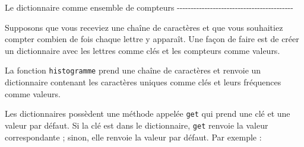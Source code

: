 \begin{Shaded}
\begin{Highlighting}[]
\OperatorTok{\textgreater{}\textgreater{}\textgreater{}}\OperatorTok{=}
\OperatorTok{\textgreater{}\textgreater{}\textgreater{}}  
\end{Highlighting}
\end{Shaded}

Le dictionnaire comme ensemble de compteurs
-\/-\/-\/-\/-\/-\/-\/-\/-\/-\/-\/-\/-\/-\/-\/-\/-\/-\/-\/-\/-\/-\/-\/-\/-\/-\/-\/-\/-\/-\/-\/-\/-\/-\/-\/-\/-\/-\/-\/-\/-\/-

Supposons que vous receviez une chaîne de caractères et que vous
souhaitiez compter combien de fois chaque lettre y apparaît. Une façon
de faire est de créer un dictionnaire avec les lettres comme clés et les
compteurs comme valeurs.

\begin{Shaded}
\begin{Highlighting}[]
\OperatorTok{=} \NormalTok{()}
         
\OperatorTok{=} 
        \NormalTok{:}
\OperatorTok{+=} 
\end{Highlighting}
\end{Shaded}

La fonction \texttt{histogramme} prend une chaîne de caractères et
renvoie un dictionnaire contenant les caractères uniques comme clés et
leurs fréquences comme valeurs.

Les dictionnaires possèdent une méthode appelée \texttt{get} qui prend
une clé et une valeur par défaut. Si la clé est dans le dictionnaire,
\texttt{get} renvoie la valeur correspondante ; sinon, elle renvoie la
valeur par défaut. Par exemple :

\begin{Shaded}
\begin{Highlighting}[]
\OperatorTok{=} \NormalTok{()}
\OperatorTok{=}\NormalTok{) }\OperatorTok{+} 
\end{Highlighting}
\end{Shaded}

